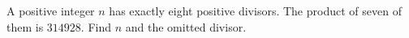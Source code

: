 A positive integer $n$ has exactly eight positive divisors. The product of seven of them is $314928$. Find $n$ and the omitted divisor.
